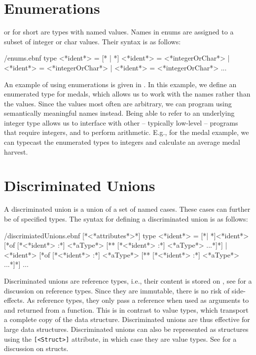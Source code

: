\section{Enumerations}
\label{sec:enums}
 or  for short are types with named values. Names in enums are assigned to a subset of integer or char values. Their syntax is as follows:
%
\begin{verbatimwrite}{\ebnf/enums.ebnf}
type <*ident*> = 
  [* | *] <*ident*> = <*integerOrChar*>
  | <*ident*> = <*integerOrChar*>
  | <*ident*> = <*integerOrChar*>
  ...
\end{verbatimwrite}
%
An example of using enumerations is given in .
%
%
In this example, we define an enumerated type for medals, which allows us to work with the names rather than the values. Since the values most often are arbitrary, we can program using semantically meaningful names instead. Being able to refer to an underlying integer type allows us to interface with other -- typically low-level -- programs that require integers, and to perform arithmetic. E.g., for the medal example, we can typecast the enumerated types to integers and calculate an average medal harvest.

\section{Discriminated Unions}
\label{sec:discriminatedUnions}
A discriminated union is a union of a set of named cases. These cases can further be of specified types. The syntax for defining a discriminated union is as follows:
%
\begin{verbatimwrite}{\ebnf/discrimiatedUnions.ebnf}
[*<*attributes*>*] 
type <*ident*> = 
  [*| *]<*ident*> [*of [*<*ident*> :*] <*aType*> [** [*<*ident*> :*] <*aType*> ...*]*]
  | <*ident*> [*of [*<*ident*> :*] <*aType*> [** [*<*ident*> :*] <*aType*> ...*]*]
  ...
\end{verbatimwrite}
%
Discriminated unions are reference types, i.e., their content is stored on , see  for a discussion on reference types. Since they are immutable, there is no risk of side-effects. As reference types, they only pass a reference when used as arguments to and returned from a function. This is in contrast to value types, which transport a complete copy of the data structure. Discriminated unions are thus effective for large data structures. Discriminated unions can also be represented as structures using the \lstinline{[<Struct>]} attribute, in which case they are value types. See  for a discussion on structs.

